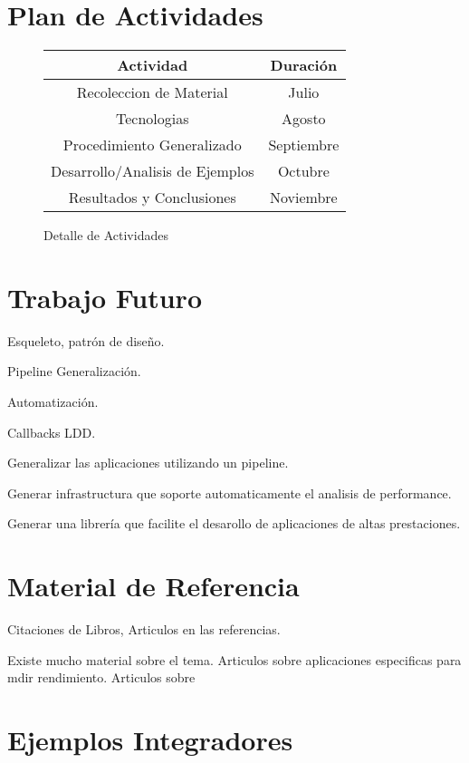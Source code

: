 \documentclass[a4paper,twocolumn]{article}
\begin{document}
\section{Plan de Actividades}

\begin{figure}[H]
  \begin{center}
    \begin{tabular}{|c|c|}\hline
      {\bf Actividad} & {\bf Duraci\'on} \\ \hline
      Recoleccion de Material & Julio \\ \hline
      Tecnologias & Agosto \\ \hline
      Procedimiento Generalizado & Septiembre \\ \hline
      Desarrollo/Analisis de Ejemplos & Octubre \\ \hline
      Resultados y Conclusiones & Noviembre \\ \hline
    \end{tabular}
    \caption{Detalle de Actividades}
  \end{center}
  \label{schedule}
\end{figure}

\section{Trabajo Futuro}

Esqueleto, patr\'on de dise\~no.

Pipeline Generalizaci\'on.

Automatizaci\'on.

Callbacks LDD.

Generalizar las aplicaciones utilizando un pipeline.

Generar infrastructura que soporte automaticamente el analisis de performance.

Generar una librer\'ia que facilite el desarollo de aplicaciones de altas prestaciones.

\section{Material de Referencia}

Citaciones de Libros, Articulos en las referencias.

Existe mucho material sobre el tema.
Articulos sobre aplicaciones especificas para mdir rendimiento.
Articulos sobre 

\appendix

\section{Ejemplos Integradores}
\end{document}
